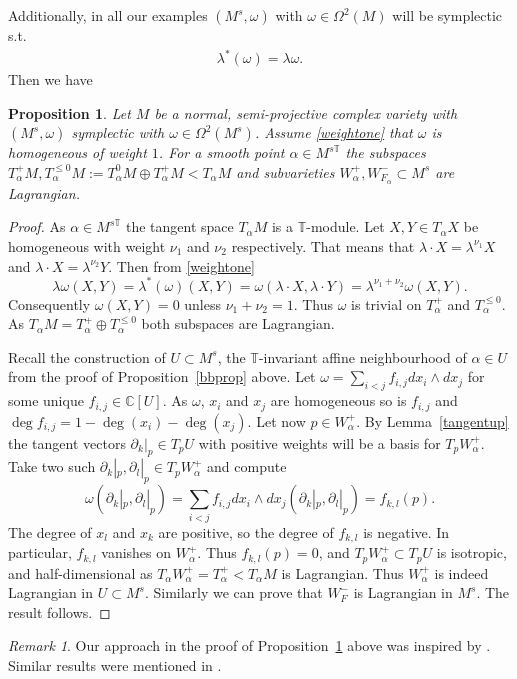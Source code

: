 \documentclass[12pt]{article}
\numberwithin{equation}{section}
\newtheorem{proposition}[theorem]{Proposition}
\theoremstyle{remark}
\newtheorem{remark}[theorem]{Remark}
\theoremstyle{definition}
\numberwithin{theorem}{section}
\def\beq{\begin{eqnarray}}
\def\eeq{\end{eqnarray}}
\def\C{\mathbb{C}}
\newcommand{\T}{{\mathbb{T}}}
\renewcommand{\1}{\mathbbm{1}}
\begin{document}
Additionally, in all our examples  $(M^s,\omega)$ with $\omega\in \Omega^2(M)$ will be  symplectic  s.t. \beq \label{weightone}\lambda^*(\omega)=\lambda\omega.\eeq Then we have
\begin{proposition} \label{lagrangian} Let $M$ be a normal, semi-projective complex variety with $(M^s,\omega)$ symplectic with $\omega\in \Omega^2(M^s)$. Assume \eqref{weightone} that $\omega$ is homogeneous of weight $1$.  For a smooth point $\alpha\in M^{s\T}$ the subspaces $T^+_\alpha M, T^{\leq 0}_\alpha M:=T^0_\alpha M\oplus T^+_\alpha M <T_\alpha M$ and subvarieties $W^+_\alpha,W^-_{F_\alpha}\subset M^s$ are Lagrangian.
\end{proposition}
\begin{proof} As $\alpha\in M^{s\T}$ the tangent space $T_\alpha M$ is a $\T$-module. Let $X,Y\in T_\alpha X$ be homogeneous  with weight $\nu_1$ and $\nu_2$ respectively. That means that $\lambda\cdot X=\lambda^{\nu_1} X$ and $\lambda\cdot X=\lambda^{\nu_2} Y$. Then from \eqref{weightone} $$\lambda\omega(X,Y)=\lambda^*(\omega)(X,Y)=\omega(\lambda\cdot X,\lambda\cdot Y)=\lambda^{\nu_1+\nu_2}\omega(X,Y).$$ Consequently $\omega(X,Y)=0$ unless $\nu_1+\nu_2=1$. Thus $\omega$ is trivial on $T^+_\alpha$ and $T^{\leq 0}_\alpha$. As $T_\alpha M=T^+_\alpha\oplus T^{\leq 0}_\alpha$ both subspaces are Lagrangian.
	
	Recall the construction of $U\subset M^s$, the $\T$-invariant affine neighbourhood of $\alpha\in U$ from the proof of Proposition~\ref{bbprop} above.  Let $\omega=\sum_{i<j} f_{i,j} dx_i\wedge dx_j$ for some unique $f_{i,j}\in \C[U]$. As $\omega$, $x_i$ and $x_j$ are homogeneous so is $f_{i,j}$ and $\deg{f_{i,j}}=1-\deg(x_i)-\deg(x_j)$. Let now $p\in W^+_\alpha $. By Lemma~\ref{tangentup} the tangent vectors $\partial_k|_p\in T_p U$ with positive weights will be a basis for $T_p W^+_\alpha$. Take two such $\partial_k|_p, \partial_l|_p\in T_pW^+_\alpha$ and compute $$\omega(\partial_k|_p,\partial_l|_p)=\sum_{i<j} f_{i,j} dx_i\wedge dx_j(\partial_k|_p,\partial_l|_p)=f_{k,l}(p).$$
	The degree of $x_l$ and $x_k$ are positive, so the degree of $f_{k,l}$ is negative. In particular, $f_{k,l}$ vanishes on $W^+_\alpha$. Thus $f_{k,l}(p)=0$, and $T_pW^+_\alpha\subset T_p U$ is isotropic, and half-dimensional as $T_\alpha W^+_\alpha=T_\alpha^+<T_\alpha M$ is Lagrangian. Thus $W^+_\alpha$ is indeed Lagrangian in $U\subset M^s$. Similarly we can prove that $W^-_F$ is Lagrangian in $M^s$. The result follows.\end{proof}
\begin{remark} Our approach in the  proof of Proposition~\ref{lagrangian} above was inspired by \cite[\S 2.2]{bellamy-etal}. Similar results were mentioned in \cite[Proposition 7.1]{nakajima}.
\end{remark}
\end{document}
